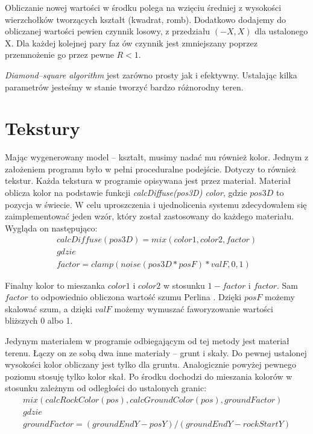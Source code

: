 \documentclass[inz,longabstract]{iithesis}
\begin{document}
        Obliczanie nowej wartości w środku polega na wzięciu średniej z wysokości wierzchołków tworzących kształt (kwadrat, romb). Dodatkowo dodajemy do obliczanej wartości pewien czynnik losowy, z przedziału $(-X, X)$ dla ustalonego X. Dla każdej kolejnej pary faz ów czynnik jest zmniejszany poprzez przemnożenie go przez pewne $R < 1$.
        
        \textit{Diamond--square algorithm} jest zarówno prosty jak i efektywny. Ustalając kilka parametrów jesteśmy w stanie tworzyć bardzo różnorodny teren. 
        
    \section{Tekstury}
        Mając wygenerowany model -- kształt,  musimy nadać mu również kolor. Jednym z założeniem programu było w pełni proceduralne podejście. Dotyczy to również tekstur. Każda tekstura w programie opisywana jest przez materiał. Materiał oblicza kolor na podstawie funkcji \textit{calcDiffuse(pos3D) \textrightarrow color}, gdzie $pos3D$ to pozycja w świecie. W celu uproszczenia i ujednolicenia systemu zdecydowałem się zaimplementować jeden wzór, który został zastosowany do każdego materiału. Wygląda on następująco:
        \begin{gather*} \label{eqn:material}
            calcDiffuse(pos3D) = mix(color1, color2, factor) \\
            gdzie \\
            factor = clamp(noise(pos3D * posF) * valF, 0, 1)
        \end{gather*}
        

        Finalny kolor to mieszanka $color1$ i $color2$ w stosunku $1 - factor$ i $factor$. Sam $factor$ to odpowiednio obliczona wartość szumu Perlina \cite{perlinNoise}. Dzięki $posF$ możemy skalować szum, a dzięki $valF$ możemy wymuszać faworyzowanie wartości bliższych 0 albo 1.
        
        Jedynym materiałem w programie odbiegającym od tej metody jest materiał terenu. Łączy on ze sobą dwa inne materiały -- grunt i skały. Do pewnej ustalonej wysokości kolor obliczany jest tylko dla gruntu. Analogicznie powyżej pewnego poziomu stosuję tylko kolor skał. Po środku dochodzi do mieszania kolorów w stosunku zależnym od odległości do ustalonych granic:
        \begin{gather*}
        mix(calcRockColor(pos), calcGroundColor(pos), groundFactor) \\
        gdzie \\
        groundFactor = (groundEndY - posY) / (groundEndY - rockStartY) \\
        \end{gather*}
        
\end{document}
